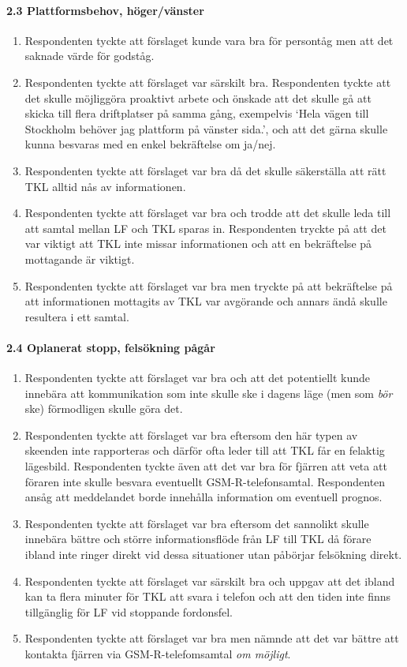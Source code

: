 \paragraph{2.3 Plattformsbehov, höger/vänster}
\begin{enumerate}
    \item Respondenten tyckte att förslaget kunde vara bra för persontåg men att det saknade värde för godståg.
    \item Respondenten tyckte att förslaget var särskilt bra.
    Respondenten tyckte att det skulle möjliggöra proaktivt arbete och önskade att det skulle gå att skicka till flera driftplatser på samma gång, exempelvis \lq{}Hela vägen till Stockholm behöver jag plattform på vänster sida.\rq{}, och att det gärna skulle kunna besvaras med en enkel bekräftelse om ja/nej.
    \item Respondenten tyckte att förslaget var bra då det skulle säkerställa att rätt TKL alltid nås av informationen.
    \item Respondenten tyckte att förslaget var bra och trodde att det skulle leda till att samtal mellan LF och TKL sparas in.
    Respondenten tryckte på att det var viktigt att TKL inte missar informationen och att en bekräftelse på mottagande är viktigt.
    \item Respondenten tyckte att förslaget var bra men tryckte på att bekräftelse på att informationen mottagits av TKL var avgörande och annars ändå skulle resultera i ett samtal.
\end{enumerate}
\hspace{-12pt}
\paragraph{2.4 Oplanerat stopp, felsökning pågår}
\begin{enumerate}
    \item Respondenten tyckte att förslaget var bra och att det potentiellt kunde innebära att kommunikation som inte skulle ske i dagens läge (men som \emph{bör} ske) förmodligen skulle göra det.
    \item Respondenten tyckte att förslaget var bra eftersom den här typen av skeenden inte rapporteras och därför ofta leder till att TKL får en felaktig lägesbild.
    Respondenten tyckte även att det var bra för fjärren att veta att föraren inte skulle besvara eventuellt GSM-R-telefonsamtal.
    Respondenten ansåg att meddelandet borde innehålla information om eventuell prognos.
    \item Respondenten tyckte att förslaget var bra eftersom det sannolikt skulle innebära bättre och större informationsflöde från LF till TKL då förare ibland inte ringer direkt vid dessa situationer utan påbörjar felsökning direkt.
    \item Respondenten tyckte att förslaget var särskilt bra och uppgav att det ibland kan ta flera minuter för TKL att svara i telefon och att den tiden inte finns tillgänglig för LF vid stoppande fordonsfel.
    \item Respondenten tyckte att förslaget var bra men nämnde att det var bättre att kontakta fjärren via GSM-R-telefomsamtal \emph{om möjligt}.
\end{enumerate}
\hspace{-12pt}
